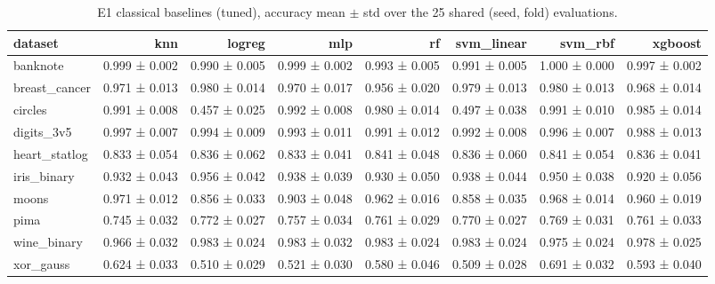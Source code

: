 \begin{table}[ht]
\centering
\caption{E1 classical baselines (tuned), accuracy mean $\pm$ std over the 25 shared (seed, fold) evaluations.}
\label{tab:e1-tuned-accuracy}
\begin{tabular}{lrrrrrrr}
\toprule
dataset & knn & logreg & mlp & rf & svm\_linear & svm\_rbf & xgboost \\
\midrule
banknote & 0.999 ± 0.002 & 0.990 ± 0.005 & 0.999 ± 0.002 & 0.993 ± 0.005 & 0.991 ± 0.005 & 1.000 ± 0.000 & 0.997 ± 0.002 \\
breast\_cancer & 0.971 ± 0.013 & 0.980 ± 0.014 & 0.970 ± 0.017 & 0.956 ± 0.020 & 0.979 ± 0.013 & 0.980 ± 0.013 & 0.968 ± 0.014 \\
circles & 0.991 ± 0.008 & 0.457 ± 0.025 & 0.992 ± 0.008 & 0.980 ± 0.014 & 0.497 ± 0.038 & 0.991 ± 0.010 & 0.985 ± 0.014 \\
digits\_3v5 & 0.997 ± 0.007 & 0.994 ± 0.009 & 0.993 ± 0.011 & 0.991 ± 0.012 & 0.992 ± 0.008 & 0.996 ± 0.007 & 0.988 ± 0.013 \\
heart\_statlog & 0.833 ± 0.054 & 0.836 ± 0.062 & 0.833 ± 0.041 & 0.841 ± 0.048 & 0.836 ± 0.060 & 0.841 ± 0.054 & 0.836 ± 0.041 \\
iris\_binary & 0.932 ± 0.043 & 0.956 ± 0.042 & 0.938 ± 0.039 & 0.930 ± 0.050 & 0.938 ± 0.044 & 0.950 ± 0.038 & 0.920 ± 0.056 \\
moons & 0.971 ± 0.012 & 0.856 ± 0.033 & 0.903 ± 0.048 & 0.962 ± 0.016 & 0.858 ± 0.035 & 0.968 ± 0.014 & 0.960 ± 0.019 \\
pima & 0.745 ± 0.032 & 0.772 ± 0.027 & 0.757 ± 0.034 & 0.761 ± 0.029 & 0.770 ± 0.027 & 0.769 ± 0.031 & 0.761 ± 0.033 \\
wine\_binary & 0.966 ± 0.032 & 0.983 ± 0.024 & 0.983 ± 0.032 & 0.983 ± 0.024 & 0.983 ± 0.024 & 0.975 ± 0.024 & 0.978 ± 0.025 \\
xor\_gauss & 0.624 ± 0.033 & 0.510 ± 0.029 & 0.521 ± 0.030 & 0.580 ± 0.046 & 0.509 ± 0.028 & 0.691 ± 0.032 & 0.593 ± 0.040 \\
\bottomrule
\end{tabular}
\end{table}
